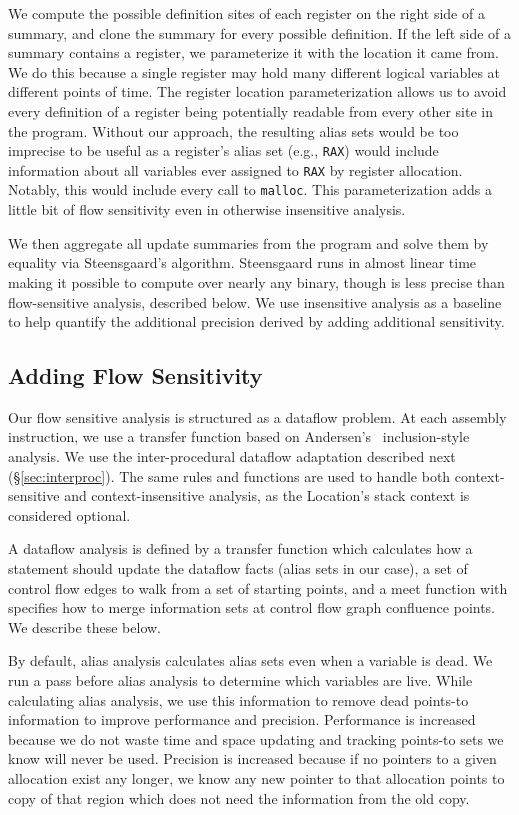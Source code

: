 We compute the possible definition sites of each register on the right side of a summary, and clone the summary for every possible definition.
If the left side of a summary contains a register, we parameterize it with the location it came from.
We do this because a single register may hold many different logical variables at different points of time.
The register location parameterization allows us to avoid every definition of a register being potentially readable from every other site in the program.
Without our approach, the resulting alias sets would be too imprecise to be useful as a register's alias set (e.g., \texttt{RAX}) would include information about all variables ever assigned to \texttt{RAX} by register allocation.
Notably, this would include every call to \texttt{malloc}.
This parameterization adds a little bit of flow sensitivity even in otherwise insensitive analysis.

We then aggregate all update summaries from the program and solve them by equality via Steensgaard's algorithm.
Steensgaard runs  in almost linear time~\cite{steensgaard-alias} making it possible to compute over nearly any binary, though is less precise than flow-sensitive analysis, described below.
We use insensitive analysis as a baseline to help quantify the additional precision derived by adding additional sensitivity.




\subsection{Adding Flow Sensitivity}
Our flow sensitive analysis is structured as a dataflow problem.  At each assembly instruction, we use a transfer
function based on Andersen's~\cite{andersen} inclusion-style analysis.
We use the inter-procedural dataflow adaptation described next (\S\ref{sec:interproc}).
The same rules and functions are used to handle both context-sensitive
and context-insensitive analysis, as the Location's stack context is
considered optional.

A dataflow analysis is defined by a transfer function which calculates how a statement should update the dataflow facts
(alias sets in our case),
a set of control flow edges to walk from a set of starting points,
and a meet function with specifies how to merge information sets at control flow graph confluence points.
We describe these below.

By default, alias analysis calculates alias sets even when a variable is dead.
We run a pass before alias analysis to determine which variables are live.
While calculating alias analysis, we use this information to remove dead points-to information to improve performance and precision.
Performance is increased because we do not waste time and space updating and tracking points-to
sets we know will never be used.
Precision is increased because if no pointers to a given allocation exist any longer, we know any new pointer to that allocation points to copy of that region which does not need the information from the old copy.

